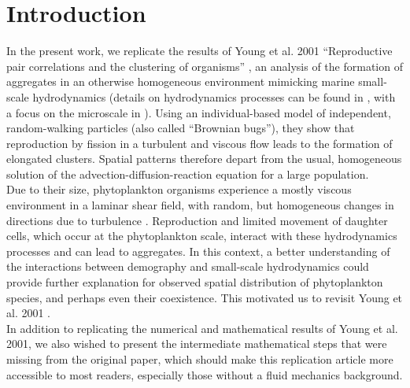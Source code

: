 
\section*{Introduction}

In the present work, we replicate the results of Young et al. 2001 ``Reproductive pair correlations and the clustering of organisms'' \cite{young_reproductive_2001}, an analysis of the formation of aggregates in an otherwise homogeneous environment mimicking marine small-scale hydrodynamics {\color{blue}(details on hydrodynamics processes can be found in \citealt{tennekes1972first}, with a focus on the microscale in \citealt{dusenbery2009living})}. Using an individual-based model of independent, random-walking particles (also called ``Brownian bugs''), they show that reproduction by fission in a turbulent and viscous flow leads to the formation of elongated clusters. Spatial patterns therefore depart from the usual, homogeneous solution of the advection-diffusion-reaction equation for a large population. \\

Due to their size, phytoplankton organisms experience a mostly viscous environment in a laminar shear field, with random, but homogeneous changes in directions due to turbulence {\color{blue} \citep{dusenbery2009living, peters_effects_2000}}. Reproduction and limited movement of daughter cells, which occur at the phytoplankton scale, interact with these hydrodynamics processes and can lead to aggregates.  In this context, a better understanding of the interactions between demography and small-scale hydrodynamics could provide further explanation for observed spatial distribution of phytoplankton species, and perhaps even their coexistence. This motivated us to revisit Young et al. 2001 \cite{young_reproductive_2001}. \\

In addition to replicating the numerical and mathematical results of Young et al. 2001, we also wished to present the intermediate mathematical steps that were missing from the original paper, which should make this replication article more accessible to most readers, especially those without a fluid mechanics background. 

